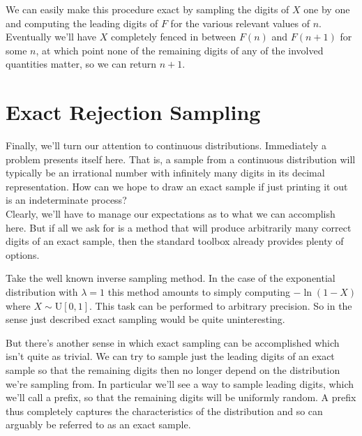 \documentclass{article}
\begin{document}
We can easily make this procedure exact by sampling the digits of $X$ one by one and computing the leading digits of $F$ for the various relevant values of $n$. Eventually we'll have $X$ completely fenced in between $F(n)$ and $F(n+1)$ for some $n$, at which point none of the remaining digits of any of the involved quantities matter, so we can return $n+1$.

\section{Exact Rejection Sampling}

Finally, we'll turn our attention to continuous distributions. Immediately a problem presents itself here. That is, a sample from a continuous distribution will typically be an irrational number with infinitely many digits in its decimal representation. How can we hope to draw an exact sample if just printing it out is an indeterminate process?\\
Clearly, we'll have to manage our expectations as to what we can accomplish here. But if all we ask for is a method that will produce arbitrarily many correct digits of an exact sample, then the standard toolbox already provides plenty of options.

Take the well known inverse sampling method. In the case of the exponential distribution with $\lambda = 1$ this method amounts to simply computing $-\ln(1-X)$ where $X \sim \text{U}[0,1]$. This task can be performed to arbitrary precision. So in the sense just described exact sampling would be quite uninteresting.

But there's another sense in which exact sampling can be accomplished which isn't quite as trivial. We can try to sample just the leading digits of an exact sample so that the remaining digits then no longer depend on the distribution we're sampling from. In particular we'll see a way to sample leading digits, which we'll call a prefix, so that the remaining digits will be uniformly random. A prefix thus completely captures the characteristics of the distribution and so can arguably be referred to as an exact sample.
\end{document}
